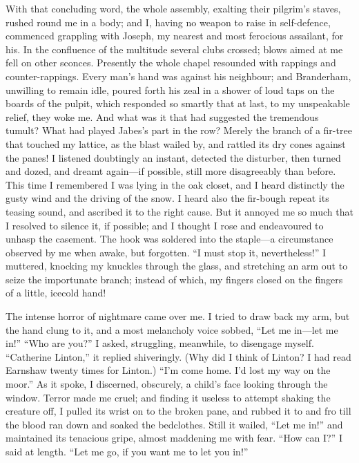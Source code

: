 With that concluding word, the whole assembly,
exalting their pilgrim's staves, rushed round me in a body; and I,
having no weapon to raise in self-defence, commenced grappling with
Joseph, my nearest and most ferocious assailant, for his. In the
confluence of the multitude several clubs crossed; blows aimed at me
fell on other sconces. Presently the whole chapel resounded with
rappings and counter-rappings. Every man's hand was against his
neighbour; and Branderham, unwilling to remain idle, pour\-ed forth his
zeal in a shower of loud taps on the boards of the pulpit, which
responded so smartly that at last, to my unspeakable relief, they woke
me. And what was it that had suggested the tremendous tumult? What had
played Jabes's part in the row?  Merely the branch of a fir-tree that
touched my lattice, as the blast wailed by, and rattled its dry cones
against the panes! I listened doubtingly an instant, detected the
disturber, then turned and dozed, and dreamt again---if possible, still
more disagreeably than before.  This time I remembered I was lying in
the oak closet, and I heard distinctly the gusty wind and the driving of
the snow. I heard also the fir-bough repeat its teasing sound, and
ascribed it to the right cause.  But it annoyed me so much that I
resolved to silence it, if possible; and I thought I rose and
endeavoured to unhasp the casement. The hook was soldered into the
staple---a circumstance observed by me when awake, but forgotten. ``I
must stop it, nevertheless!'' I muttered, knocking my knuckles through
the glass, and stretching an arm out to seize the importunate branch;
instead of which, my fingers closed on the fingers of a little, icecold
hand!

The intense horror of nightmare came over me.  I tried to draw
back my arm, but the hand clung to it, and a most melancholy voice
sobbed, ``Let me in---let me in!'' ``Who are you?'' I asked, struggling,
meanwhile, to disengage myself. ``Catherine Linton,'' it replied
shiveringly. (Why did I think of Linton? I had read Earnshaw twenty
times for Linton.) ``I'm come home. I'd lost my way on the moor.''  As
it spoke, I discerned, obscurely, a child's face looking through the
window. Terror made me cruel; and finding it useless to attempt shaking
the creature off, I pulled its wrist on to the broken pane, and rubbed
it to and fro till the blood ran down and soaked the bedclothes. Still
it wailed, ``Let me in!'' and maintained its tenacious gripe, almost
maddening me with fear. ``How can I?''  I said at length. ``Let me go,
if you want me to let you in!''

